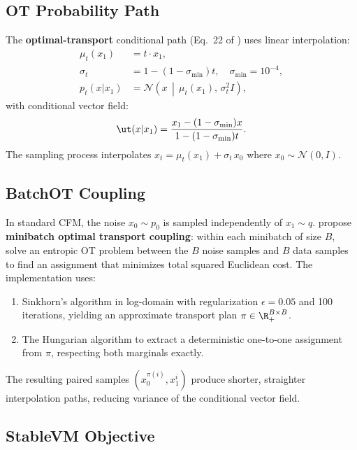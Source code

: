 \subsection{OT Probability Path}

The \textbf{optimal-transport} conditional path (Eq.~22 of \citealt{lipman2023flow}) uses linear interpolation:
\begin{align}
    \mu_t(x_1) &= t \cdot x_1, \label{eq:ot_mu} \\
    \sigma_t &= 1 - (1 - \sigma_{\min}) t, \quad \sigma_{\min} = 10^{-4}, \label{eq:ot_sigma} \\
    p_t(x | x_1) &= \mathcal{N}\!\left(x \,\middle|\, \mu_t(x_1),\, \sigma_t^2 I\right), \label{eq:ot_path}
\end{align}
with conditional vector field:
\begin{equation}
    \ut(x | x_1) = \frac{x_1 - (1 - \sigma_{\min}) x}{1 - (1 - \sigma_{\min}) t}.
    \label{eq:ot_vf}
\end{equation}
The sampling process interpolates $x_t = \mu_t(x_1) + \sigma_t \, x_0$ where $x_0 \sim \mathcal{N}(0, I)$.

\subsection{BatchOT Coupling}
\label{sec:batchot}

In standard CFM, the noise $x_0 \sim p_0$ is sampled independently of $x_1 \sim q$. \citet{tong2024improving} propose \textbf{minibatch optimal transport coupling}: within each minibatch of size $B$, solve an entropic OT problem between the $B$ noise samples and $B$ data samples to find an assignment that minimizes total squared Euclidean cost. The implementation uses:
\begin{enumerate}
    \item Sinkhorn's algorithm \citep{cuturi2013sinkhorn} in log-domain with regularization $\epsilon = 0.05$ and 100 iterations, yielding an approximate transport plan $\pi \in \R^{B \times B}_+$.
    \item The Hungarian algorithm to extract a deterministic one-to-one assignment from $\pi$, respecting both marginals exactly.
\end{enumerate}
The resulting paired samples $(x_0^{\pi(i)}, x_1^i)$ produce shorter, straighter interpolation paths, reducing variance of the conditional vector field.

\subsection{StableVM Objective}
\label{sec:stablevm}


